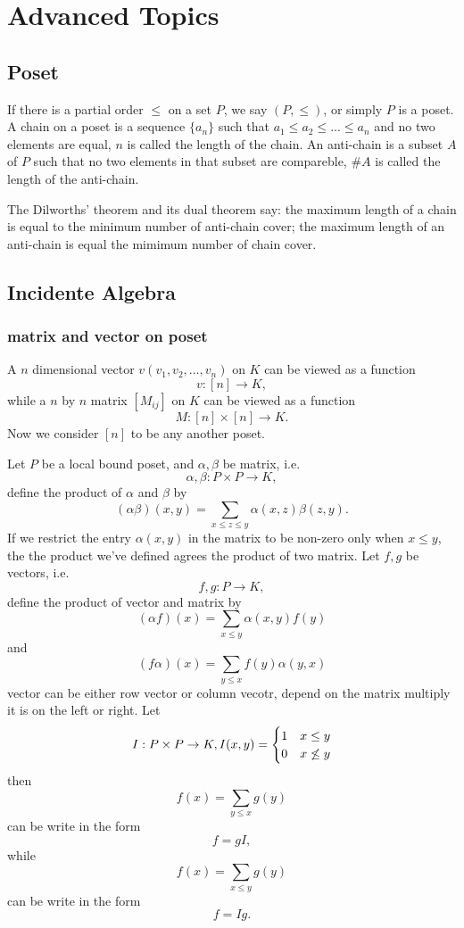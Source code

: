 \section{Advanced Topics}
\subsection{Poset}
If there is a partial order $\leq$ on a set $P$, we say $(P,\leq)$, or simply $P$ is a poset.
A chain on a poset is a sequence $\{a_n\}$ such that $a_1\leq a_2\leq...\leq a_n$ and no two elements are equal,
$n$ is called the length of the chain.
An anti-chain is a subset $A$ of $P$ such that no two elements in that subset are compareble,
$\#A$ is called the length of the anti-chain.

The Dilworths' theorem and its dual theorem say:
the maximum length of a chain is equal to the minimum number of anti-chain cover;
the maximum length of an anti-chain is equal the mimimum number of chain cover.

\subsection{Incidente Algebra}
\subsubsection{matrix and vector on poset}
A $n$ dimensional vector $v(v_1 , v_2 , \dots , v_n)$ on $K$
can be viewed as a function $$v : [n] \to K,$$
while a $n$ by $n$ matrix $[M_{ij}]$ on $K$ can be viewed as
a function $$M : [n] \times [n] \to K.$$ Now we consider
$[n]$ to be any another poset.

Let $P$ be a local bound poset, 
and $\alpha, \beta$ be matrix, i.e.
$$\alpha , \beta : P \times P \to K,$$
define the product of $\alpha$ and $\beta$ by
$$(\alpha \beta)(x , y) = \sum_{x \leq z \leq y} \alpha(x,z) \beta(z,y).$$
If we restrict the entry $\alpha(x,y)$ in the matrix
to be non-zero only when $x \leq y$, the the product 
we've defined agrees the product of two matrix.
Let $f, g$ be vectors, i.e.
$$f , g : P \to K,$$
define the product of vector and matrix by 
$$(\alpha f)(x) = \sum_{x \leq y} \alpha(x,y)f(y)$$
and
$$(f \alpha)(x) = \sum_{y \leq x} f(y)\alpha(y,x)$$
vector can be either row vector or column vecotr, 
depend on the matrix multiply it is on the left or right.
Let $$I : P \times P \to K, I(x,y) = \begin{cases} 1 & x \leq y \cr 0 & x \not\leq y \end{cases}$$
then 
$$f(x) = \sum_{y \leq x} g(y)$$
can be write in the form
$$f = gI,$$
while 
$$f(x) = \sum_{x \leq y} g(y)$$
can be write in the form
$$f = Ig.$$

